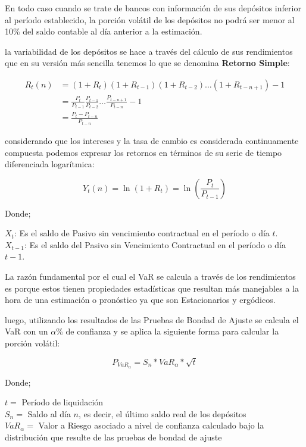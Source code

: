 \documentclass[]{article}
\begin{document}
En todo caso cuando se trate de bancos con información de sus depósitos
inferior al período establecido, la porción volátil de los depósitos no
podrá ser menor al 10\% del saldo contable al día anterior a la
estimación.

la variabilidad de los depósitos se hace a través del cálculo de sus
rendimientos que en su versión más sencilla tenemos lo que se denomina
\textbf{Retorno Simple}:

\[\begin{array}{rl}
R_{t}(n) &\displaystyle= \left(1+R_{t}\right) \left(1+R_{t-1}\right) \left(1+R_{t-2}\right) \ldots \left(1+R_{t-n+1}\right) -1\\
&\displaystyle= \frac{P_t}{P_{t-1}} \frac{P_{t-1}}{P_{t-2}} \ldots \frac{P_{t-n+1}}{P_{t-n}}-1\\
&\displaystyle= \frac{P_{t}-P_{t-n}}{P_{t-n}}
\end{array}\]

considerando que los intereses y la tasa de cambio es considerada
continuamente compuesta podemos expresar los retornos en términos de su
serie de tiempo diferenciada logarítmica:

\[Y_{t}(n)=\ln(1+R_{t})=\ln \left(\frac{P_{t}}{P_{t-1}}\right)\]

Donde;

\(X_t\): Es el saldo de Pasivo sin vencimiento contractual en el período
o día \(t\).\\
\(X_{t-1}\): Es el saldo del Pasivo sin Vencimiento Contractual en el
período o día \(t-1\).

La razón fundamental por el cual el VaR se calcula a través de los
rendimientos es porque estos tienen propiedades estadísticas que
resultan más manejables a la hora de una estimación o pronóstico ya que
son Estacionarios y ergódicos.

luego, utilizando los resultados de las Pruebas de Bondad de Ajuste se
calcula el VaR con un \(\alpha\)\% de confianza y se aplica la siguiente
forma para calcular la porción volátil:

\[P_{VaR_{\alpha}} = S_n * VaR_{\alpha} * \sqrt{t}\]

Donde;

\(t=\) Período de liquidación\\
\(S_n=\) Saldo al día \(n\), es decir, el último saldo real de los
depósitos\\
\(VaR_{\alpha}=\) Valor a Riesgo asociado a nivel de confianza calculado
bajo la distribución que resulte de las pruebas de bondad de ajuste
\end{document}
